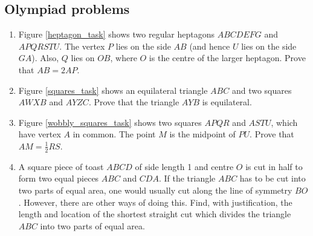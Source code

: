 \documentclass{article}
\begin{document}
  \subsection{Olympiad problems}
  \begin{enumerate}
    \item \label{heptagon_task_statement} Figure \ref{heptagon_task} shows two regular heptagons $ABCDEFG$ and $APQRSTU$. The vertex $P$ lies on the side $AB$ (and hence $U$ lies on the side $GA$). Also, $Q$ lies on $OB$, where $O$ is the centre of the larger heptagon. Prove that $AB = 2AP$.
    \item \label{squares_task_statement} Figure \ref{squares_task} shows an equilateral triangle $ABC$ and two squares $AWXB$ and $AYZC$. Prove that the triangle $AYB$ is equilateral.
    \item \label{wobbly_squares_task_statement} Figure \ref{wobbly_squares_task} shows two squares $APQR$ and $ASTU$, which have vertex $A$ in common. The point $M$ is the midpoint of $PU$. Prove that $AM = \frac{1}{2}RS$.

    \item A square piece of toast $ABCD$ of side length 1 and centre $O$ is cut in half to form two equal pieces $ABC$ and $CDA$. If the triangle $ABC$ has to be cut into two parts of equal area, one would usually cut along the line of symmetry $BO$. However, there are other ways of doing this. Find, with justification, the length and location of the shortest straight cut which divides the triangle $ABC$ into two parts of equal area.


\end{enumerate}
\end{document}
